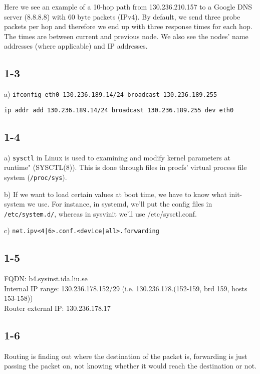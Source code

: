 Here we see an example of a 10-hop path from 130.236.210.157 to a Google DNS server (8.8.8.8) with 60 byte packets (IPv4). By default, we send three probe packets per hop and therefore we end up with three response times for each hop. The times are between current and previous node. We also see the nodes' name addresses (where applicable) and IP addresses.

\subsection{1-3}
a)
\verb=ifconfig eth0 130.236.189.14/24 broadcast 130.236.189.255=

\verb=ip addr add 130.236.189.14/24 broadcast 130.236.189.255 dev eth0=

\subsection{1-4}
a) \verb=sysctl= in Linux is used to examining and modify kernel parameters at runtime" (SYSCTL(8)). This is done through files in procfs' virtual process file system (\verb=/proc/sys=).

b) If we want to load certain values at boot time, we have to know what init-system we use. For instance, in systemd, we'll put the config files in \verb=/etc/system.d/=, whereas in sysvinit we'll use /etc/sysctl.conf.

c) \verb=net.ipv<4|6>.conf.<device|all>.forwarding=

\subsection{1-5}
FQDN: b4.sysinst.ida.liu.se\\
Internal IP range: 130.236.178.152/29 (i.e. 130.236.178.(152-159, brd 159, hosts 153-158))\\
Router external IP: 130.236.178.17

\subsection{1-6}
Routing is finding out where the destination of the packet is, forwarding is just passing the packet on, not knowing whether it would reach the destination or not.
